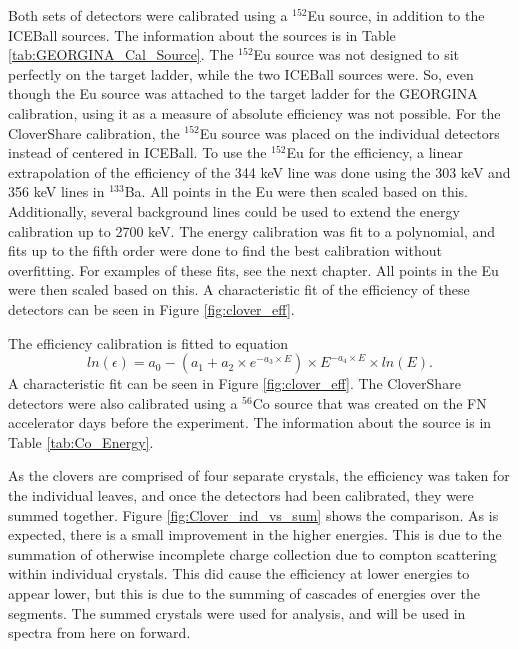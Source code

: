 Both sets of detectors were calibrated using a $^{152}$Eu source, in addition to the ICEBall sources. The information about the sources is in Table \ref{tab:GEORGINA_Cal_Source}. The $^{152}$Eu source was not designed to sit perfectly on the target ladder, while the two ICEBall sources were. So, even though the Eu source was attached to the target ladder for the GEORGINA calibration, using it as a measure of absolute efficiency was not possible. For the CloverShare calibration, the $^{152}$Eu source was placed on the individual detectors instead of centered in ICEBall. To use the $^{152}$Eu for the efficiency, a linear extrapolation of the efficiency of the 344 keV line was done using the 303 keV and 356 keV lines in $^{133}$Ba. All points in the Eu were then scaled based on this. Additionally, several background lines could be used to extend the energy calibration up to 2700 keV. The energy calibration was fit to a polynomial, and fits up to the fifth order were done to find the best calibration without overfitting. For examples of these fits, see the next chapter. All points in the Eu were then scaled based on this. A characteristic fit of the efficiency of these detectors can be seen in Figure \ref{fig:clover_eff}.



The efficiency calibration is fitted to equation
\begin{equation}
    ln(\epsilon) = a_0-(a_1+a_2\times e^{-a_3\times E})\times E^{-a_4\times E}\times ln(E).
    \label{eq:Ge_Eff}
\end{equation}
A characteristic fit can be seen in Figure \ref{fig:clover_eff}. The CloverShare detectors were also calibrated using a $^{56}$Co source that was created on the FN accelerator days before the experiment. The information about the source is in Table \ref{tab:Co_Energy}. 





As the clovers are comprised of four separate crystals, the efficiency was taken for the individual leaves, and once the detectors had been calibrated, they were summed together. Figure \ref{fig:Clover_ind_vs_sum} shows the comparison. As is expected, there is a small improvement in the higher energies. This is due to the summation of otherwise incomplete charge collection due to compton scattering within individual crystals. This did cause the efficiency at lower energies to appear lower, but this is due to the summing of cascades of energies over the segments. The summed crystals were used for analysis, and will be used in spectra from here on forward.

